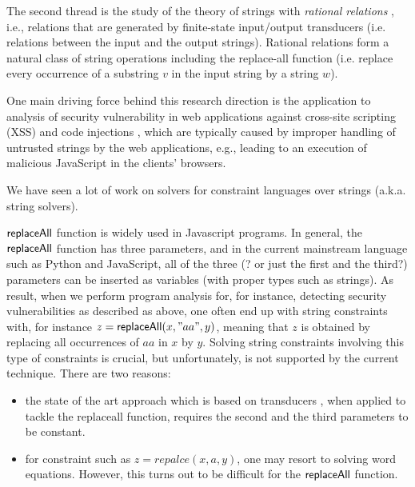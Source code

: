 
The second thread
is the study of the theory of strings with \emph{rational relations} \cite{??},
i.e., relations that are generated by finite-state input/output transducers
(i.e. relations between the input and the output strings). Rational relations
form a natural class of string operations including the replace-all function
(i.e. replace every occurrence of a substring $v$ in the input string by a
string $w$). 



One main driving force behind 
this research direction is the application to analysis of security vulnerability
in web applications against cross-site scripting (XSS) and code injections 
\cite{??}, which 
are typically caused by improper handling of untrusted strings by the web 
applications, e.g., leading to an execution of malicious JavaScript in the 
clients' browsers. 

We have seen  a lot of work on solvers for constraint languages over strings (a.k.a. string solvers). 


$\mathsf{replaceAll}$ function is widely used in Javascript programs. In general, the $\mathsf{replaceAll}$ function has three parameters, and in the current mainstream language such as Python and JavaScript, all of the three (? or just the first and the third?) parameters can be inserted as variables (with proper types such as strings). As result, when we perform program analysis for, for instance, detecting security vulnerabilities as described as above, one often end up with string constraints with, for instance $z=\mathsf{replaceAll}(x,"aa", y)$, meaning that $z$ is obtained by replacing all occurrences of $aa$ in $x$ by $y$. Solving string constraints involving this type of constraints is crucial, but unfortunately, is not supported by the current technique. There are two reasons:
\begin{itemize}
	\item the state of the art approach which is based on transducers \cite{LB16}, when applied to tackle the replaceall function, requires the second and the third parameters to be constant. 
	
	\item for constraint such as $z=repalce(x,a,y)$, one may resort to solving word equations. However, this turns out to be difficult for the $\mathsf{replaceAll}$ function.   
\end{itemize}

